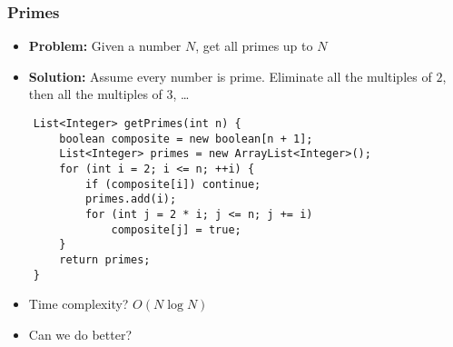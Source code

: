 \documentclass[t, handout]{beamer}
\begin{document}
\begin{frame}[fragile]

    \frametitle{Primes}
    
    \begin{itemize}
        \item \textbf{Problem:} Given a number $N$, get all primes up to $N$
        \pause
        \item \textbf{Solution:} Assume every number is prime. Eliminate all the multiples of $2$, then all the multiples of $3$, \dots
    \end{itemize}
    
    \begin{verbatim}
    List<Integer> getPrimes(int n) {
        boolean composite = new boolean[n + 1];
        List<Integer> primes = new ArrayList<Integer>();
        for (int i = 2; i <= n; ++i) {
            if (composite[i]) continue;
            primes.add(i);
            for (int j = 2 * i; j <= n; j += i)
                composite[j] = true;
        }
        return primes;
    }
    \end{verbatim}
    
    \pause
    \begin{itemize}
        \item Time complexity? \pause $O(N \log N)$
        \pause
        \item Can we do better?
    \end{itemize}
    
\end{frame}
\end{document}
